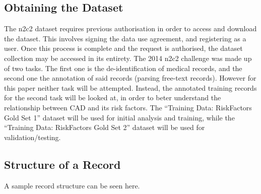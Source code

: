 \documentclass[a4paper,12pt]{article}
\begin{document}
\subsection{Obtaining the Dataset}
The n2c2 dataset requires previous authorisation in order to access and download
the dataset.
This involves signing the data use agreement, and registering as a user.
Once this process is complete and the request is authorised, the dataset
collection may be accessed in its entirety.
The 2014 n2c2 challenge was made up of two tasks.
The first one is the de-identification of medical records, and the second one
the annotation of said records (parsing free-text records).
However for this paper neither task will be attempted.
Instead, the annotated training records for the second task will be looked at,
in order to beter understand the relationship between CAD and its risk factors.
The \enquote{Training Data: RiskFactors Gold Set 1} dataset will be used for
initial analysis and training, while the \enquote{Training Data: RiskFactors
Gold Set 2} dataset will be used for validation/testing.

\subsection{Structure of a Record}
A sample record structure can be seen here.
\end{document}
